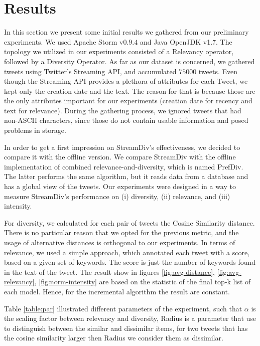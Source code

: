 \section{Results} 
In this section we present some initial results we
gathered from our preliminary experiments.
We used Apache Storm v$0.9.4$ and Java
OpenJDK v1.7. The topology we utilized in our experiments
consisted of a Relevancy operator, followed by a
Diversity Operator.
As far as our dataset is concerned,
we gathered tweets using Twitter's Streaming API,
and accumulated $75000$ tweets.
Even though the Streaming API provides a
plethora of attributes for each Tweet, we
kept only the creation date and the text.
The reason for that is because those are
the only attributes important for our experiments
(creation date for recency and text for relevance).
During the gathering process, we ignored tweets
that had non-ASCII characters, since those do
not contain usable information and posed
problems in storage.

In order to get a first impression on StreamDiv's
effectiveness, we decided to compare it with the
offline version.
We compare StreamDiv with the offline implementation
of combined relevance-and-diversity, which is named
PrefDiv. The latter performs the same
algorithm, but it reads data from a database
and has a global view of the tweets.
Our experiments were designed in a way to measure
StreamDiv's performance on (i) diversity, (ii) relevance,
and (iii) intensity.

For diversity, we calculated for each pair of tweets
the Cosine Similarity distance. There is no particular
reason that we opted for the previous metric, and the
usage of alternative distances is orthogonal to our
experiments. In terms of relevance, we used a simple
approach, which annotated each tweet with a score,
based on a given set of keywords.
The score is just the number of
keywords found in the text of the tweet.
The result show in figures \ref{fig:avg-distance}, \ref{fig:avg-relevancy}, \ref{fig:norm-intensity}
are based on the statistic of the final top-k list of each model. Hence, for the incremental algorithm the result are constant.

Table \ref{table:par} illustrated different parameters of the experiment, such that $\alpha$ is the scaling factor between relevancy and diversity,
Radius is a parameter that use to distinguish between the similar and dissimilar items, for two tweets that has the cosine similarity larger then Radius 
we consider them as dissimilar.

